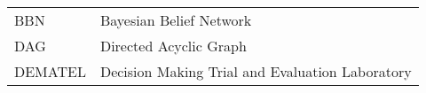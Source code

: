 \begin{longtable}{ll}
BBN & Bayesian Belief Network \\
DAG & Directed Acyclic Graph \\
DEMATEL & Decision Making Trial and Evaluation Laboratory \\

\end{longtable}

